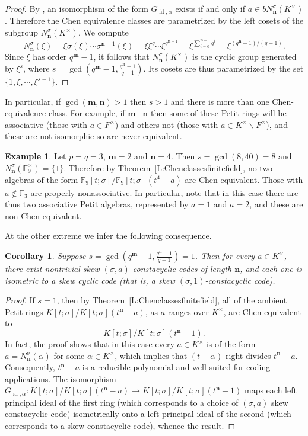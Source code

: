 \documentclass[11pt]{amsart}
\theoremstyle{plain}
\newtheorem{corollary}[theorem]{Corollary}
\theoremstyle{definition}
\newtheorem{example}[theorem]{Example}
\numberwithin{equation}{section}
\numberwithin{figure}{section}
\newcommand{\FF}{\mathbb{F}}
\DeclareMathOperator{\id}{id}
\newcommand{\os}{{\mathbf{m}}}  %
\newcommand{\de}{{\mathbf{n}}}  %
\begin{document}
\begin{proof}
    By \cite[Theorem 4.1]{Pumpluen2025}, an isomorphism of the form $G_{\id,\alpha}$ exists if and only if $a\in bN^\sigma_\de(K^\times)$. Therefore the Chen equivalence classes are parametrized by the left cosets of the subgroup $N_{\de}^\sigma(K^\times)$.  We compute
    $$
    N^\sigma_\de(\xi) = \xi \sigma(\xi) \cdots \sigma^{\de-1}(\xi) = \xi \xi^q \cdots \xi^{q^{\de-1}} = \xi^{\sum_{i=0}^{\de-1} q^i}=\xi^{(q^\de-1)/(q-1)}.
    $$
    Since $\xi$ has order $q^\os-1$, it follows that $N^\sigma_\de(K^\times)$ is the cyclic group generated by $\xi^s$, where $s=\gcd\left(q^\os-1, \frac{q^\de-1}{q-1}\right).$  Its cosets are thus parametrized by the set $\{1,\xi,\cdots, \xi^{s-1}\}$.
\end{proof}

In particular, if $\gcd(\os,\de)>1$ then $s>1$ and there is more than one Chen-equivalence class. For example, if $\os\mid \de$ then some of these Petit rings will be associative (those with $a\in F^\times$) and others not (those with $a\in K^\times\smallsetminus F^\times$), and these are not isomorphic so are never equivalent.

\begin{example}\label{Example:p=3n=2m=4}
Let  $p=q=3$, $\os=2$ and $\de=4$. Then $s=\gcd(8, 40)=8$ and  $N_\de^\sigma(\FF_9^\times)=\{1\}$.  Therefore  by Theorem~\ref{L:Chenclassesfinitefield},  no two algebras of the form $\FF_9[t;\sigma]/\FF_9[t;\sigma](t^4-a)$ are Chen-equivalent.
Those with $a\notin \FF_3$ are properly nonassociative.  In particular, note that in this case there are thus two associative Petit algebras, represented by $a=1$ and $a=2$, and these are non-Chen-equivalent.
\end{example}


At the other extreme we infer the following consequence.


\begin{corollary}\label{C:allskewequiv}
    Suppose $s = \gcd\left(q^\os-1, \frac{q^\de-1}{q-1}\right)=1$.  Then for every $a\in K^\times$, there exist nontrivial skew $(\sigma,a)$-constacyclic codes of length $\de$, and each one  is isometric to a skew cyclic code (that is, a skew $(\sigma,1)$-constacyclic code).
\end{corollary}

\begin{proof}
If $s=1$, then by Theorem~\ref{L:Chenclassesfinitefield},  all of the  ambient Petit rings $K[t;\sigma]/K[t;\sigma](t^\de-a)$, as $a$ ranges over $K^\times$, are Chen-equivalent to $$K[t;\sigma]/K[t;\sigma](t^\de-1).$$
In fact, the proof shows that in this case every $a\in K^\times$ is of the form $a=N^{\sigma}_\de(\alpha)$ for some $\alpha \in K^\times$, which implies that $(t-\alpha)$ right divides $t^\de-a$.  Consequently,  $t^\de-a$ is a reducible polynomial and well-suited for coding applications.  The isomorphism $G_{\id,\alpha}:K[t;\sigma]/K[t;\sigma](t^\de-a)\to K[t;\sigma]/K[t;\sigma](t^\de-1)$ maps each left principal ideal of the first ring (which corresponds to a choice of $(\sigma,a)$ skew constacyclic code) isometrically onto a left principal ideal of the second (which corresponds to a skew constacyclic code), whence the result.
\end{proof}
\end{document}
